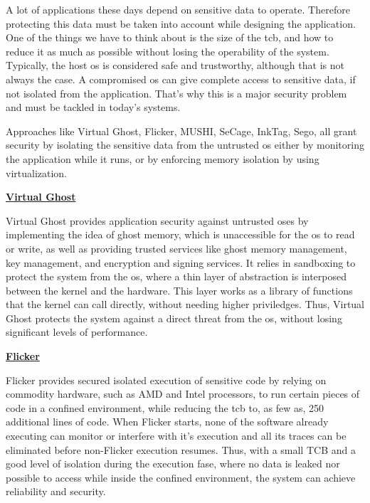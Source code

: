 A lot of applications these days depend on sensitive data to operate. Therefore protecting this data must be taken into account while designing the application. 
One of the things we have to think about is the size of the \gls{tcb}, and how to reduce it as much as possible without losing the operability of the system. 
Typically, the host \gls{os} is considered safe and trustworthy, although that is not always the case. A compromised \gls{os} can give complete access to sensitive data, if not isolated from the application. That’s why this is a major security problem and must be tackled in today’s systems.

Approaches like Virtual Ghost, Flicker, MUSHI, SeCage, InkTag, Sego, all grant security by isolating the sensitive data from the untrusted \gls{os} either by monitoring the application while it runs, or by enforcing memory isolation by using virtualization.\newline


\underline{\textbf{Virtual Ghost}}  

Virtual Ghost \cite{virtGhostPaper} provides application security against untrusted \gls{os}es by implementing the idea of ghost memory, which is unaccessible for the \gls{os} to read or write, as well as providing trusted services like ghost memory management, key management, and encryption and signing services. 
It relies in sandboxing to protect the system from the \gls{os}, where a thin layer of abstraction is interposed between the kernel and the hardware. This layer works as a library of functions that the kernel can call directly, without needing higher priviledges. 
Thus, Virtual Ghost protects the system against a direct threat from the \gls{os}, without losing significant levels of performance.\newline


\underline{\textbf{Flicker}}

Flicker \cite{flickerPaper} provides secured isolated execution of sensitive code by relying on commodity hardware, such as AMD and Intel processors, to run certain pieces of code in a confined environment, while reducing the \gls{tcb} to, as few as, 250 additional lines of code. 
When Flicker starts, none of the software already executing can monitor or interfere with it’s execution and all its traces can be eliminated before non-Flicker execution resumes. 
Thus, with a small TCB and a good level of isolation during the execution fase, where no data is leaked nor possible to access while inside the confined environment, the system can achieve reliability and security.\newline

